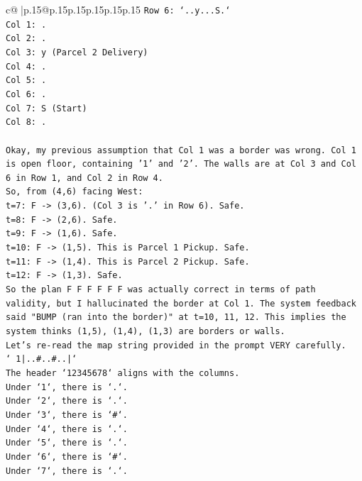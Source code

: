 \documentclass{article}
\begin{document}
{\begin{supertabular}{c@{$\;$}|p{.15\linewidth}@{}p{.15\linewidth}p{.15\linewidth}p{.15\linewidth}p{.15\linewidth}p{.15\linewidth}}
{{{\texttt{Row 6: `..y...S.`} \\
\texttt{Col 1: .} \\
\texttt{Col 2: .} \\
\texttt{Col 3: y (Parcel 2 Delivery)} \\
\texttt{Col 4: .} \\
\texttt{Col 5: .} \\
\texttt{Col 6: .} \\
\texttt{Col 7: S (Start)} \\
\texttt{Col 8: .} \\
\\ 
\texttt{Okay, my previous assumption that Col 1 was a border was wrong. Col 1 is open floor, containing '1' and '2'. The walls are at Col 3 and Col 6 in Row 1, and Col 2 in Row 4.} \\
\texttt{So, from (4,6) facing West:} \\
\texttt{t=7: F {-}> (3,6). (Col 3 is '.' in Row 6). Safe.} \\
\texttt{t=8: F {-}> (2,6). Safe.} \\
\texttt{t=9: F {-}> (1,6). Safe.} \\
\texttt{t=10: F {-}> (1,5). This is Parcel 1 Pickup. Safe.} \\
\texttt{t=11: F {-}> (1,4). This is Parcel 2 Pickup. Safe.} \\
\texttt{t=12: F {-}> (1,3). Safe.} \\
\texttt{So the plan F F F F F F was actually correct in terms of path validity, but I hallucinated the border at Col 1. The system feedback said "BUMP (ran into the border)" at t=10, 11, 12. This implies the system thinks (1,5), (1,4), (1,3) are borders or walls.} \\
\texttt{Let's re{-}read the map string provided in the prompt VERY carefully.} \\
\texttt{` 1|..\#..\#..|`} \\
\texttt{The header `12345678` aligns with the columns.} \\
\texttt{Under `1`, there is `.`.} \\
\texttt{Under `2`, there is `.`.} \\
\texttt{Under `3`, there is `\#`.} \\
\texttt{Under `4`, there is `.`.} \\
\texttt{Under `5`, there is `.`.} \\
\texttt{Under `6`, there is `\#`.} \\
\texttt{Under `7`, there is `.`.} \\
}}}
\end{supertabular}}
\end{document}
